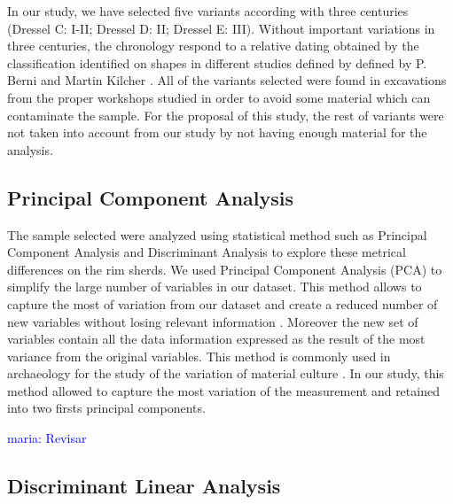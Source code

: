 \documentclass[review]{elsarticle}
\newcommand{\memo}[2]{\textcolor{#1}{#2}}
\newcommand{\maria}[1]{\memo{blue}{maria: #1\\}}
\begin{document}
In our study, we have selected five variants according with three centuries
(Dressel C: I-II; Dressel D: II; Dressel E: III). Without important variations in three centuries, the chronology respond to a relative dating obtained by the classification identified on shapes in different studies defined by defined by P. Berni \citep{berni_millet_epigrafianforica_2008} and Martin Kilcher \citep{martin-kilcher_romischen_1994}. All of the variants selected were found in excavations from the proper workshops studied in order to avoid some material which can contaminate the sample. For the proposal of this study, the rest of variants were not taken into account from our study by not having enough material for the analysis. 


\subsection{Principal Component Analysis}

The sample selected were analyzed using statistical method such as Principal Component Analysis and Discriminant Analysis to explore these metrical differences on the rim sherds.
We used Principal Component Analysis (PCA) to simplify the large number of variables in our dataset. This method allows to capture the most of variation from our dataset and create a reduced number of new variables without losing relevant information \citep{jolliffe_principal_2002, shennan_quantifying_1997}. Moreover the new set of variables contain all the data information expressed as the result of the most variance from the original variables. This method is commonly used in archaeology for the study of the variation of material culture \citep{li_crossbows_2014, schillinger_differences_2016}. In our study, this method allowed to capture the most variation of the measurement and retained into two firsts principal components. 


\maria{Revisar}

\subsection{Discriminant Linear Analysis} 
\end{document}
